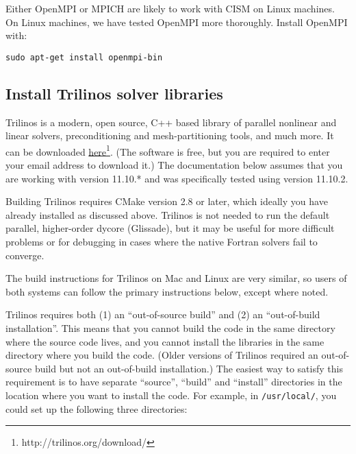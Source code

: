 \begin{mdframed}[style=ubuntu] %
Either OpenMPI or MPICH are likely to work with CISM on Linux machines.
On Linux machines, we have tested OpenMPI more thoroughly.
Install OpenMPI with:

\texttt{sudo apt-get install openmpi-bin}
\end{mdframed}                 %



\subsection{Install Trilinos solver libraries}
\label{sc:install_trilinos}

Trilinos is a modern, open source, C++ based library of parallel nonlinear and linear solvers, 
preconditioning and mesh-partitioning tools, and much more. It can be downloaded 
\href{http://trilinos.org/download/}{here}\footnote{http://trilinos.org/download/}.
(The software is free, but you are required to enter your email address to download it.) 
The documentation below assumes that you are working with version 11.10.* and was specifically 
tested using version 11.10.2. 

Building Trilinos requires CMake version 2.8 or later, which ideally you have already 
installed as discussed above. Trilinos is not needed to run the default 
parallel, higher-order dycore (Glissade), but it may be useful for  
more difficult problems or for debugging in cases where the native Fortran solvers 
fail to converge.

The build instructions for Trilinos on Mac and Linux are very similar, so users
of both systems can follow the primary instructions below, except where noted.

Trilinos requires both (1) an ``out-of-source build'' and (2) an ``out-of-build installation''. 
This means that you cannot build the code in the same directory where the source code lives, 
and you cannot install the libraries in the same directory where you build the code.
(Older versions of Trilinos required an out-of-source build but not an out-of-build installation.) 
The easiest way to satisfy this requirement is to have separate ``source'', ``build'' and 
``install'' directories in the location where you want to install the code. 
For example, in \texttt{/usr/local/}, you could set up the following three directories:

